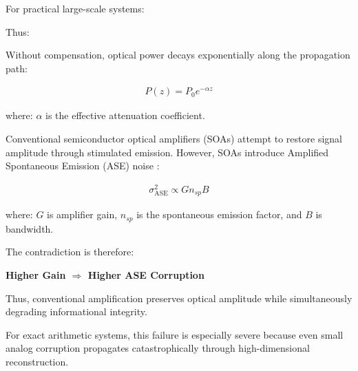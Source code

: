 \documentclass[journal]{IEEEtran}
\begin{document}
For practical large-scale systems:

\begin{center}
\end{center}

\begin{center}
\end{center}

\begin{center}
\end{center}

\begin{center}
\end{center}

Thus:

\begin{center}
\end{center}


Without compensation, optical power decays exponentially along the propagation path:

\begin{align}
P(z) = P_0 e^{-\alpha z}
\label{eq:loss_exponential}
\end{align}

where: $\alpha$ is the effective attenuation coefficient.

Conventional semiconductor optical amplifiers (SOAs) attempt to restore signal amplitude through stimulated emission. However, SOAs introduce Amplified Spontaneous Emission (ASE) noise \cite{Winzer2006,Saleh2019}:

\begin{align}
\sigma^2_{\mathrm{ASE}} \propto Gn_{sp}B
\label{eq:ase_noise}
\end{align}

where: $G$ is amplifier gain, $n_{sp}$ is the spontaneous emission factor, and $B$ is bandwidth.

The contradiction is therefore:

\begin{center}
\textbf{Higher Gain $\Longrightarrow$ Higher ASE Corruption}
\label{eq:gain_contradiction}
\end{center}

Thus, conventional amplification preserves optical amplitude while simultaneously degrading informational integrity.

For exact arithmetic systems, this failure is especially severe because even small analog corruption propagates catastrophically through high-dimensional reconstruction.
\end{document}
